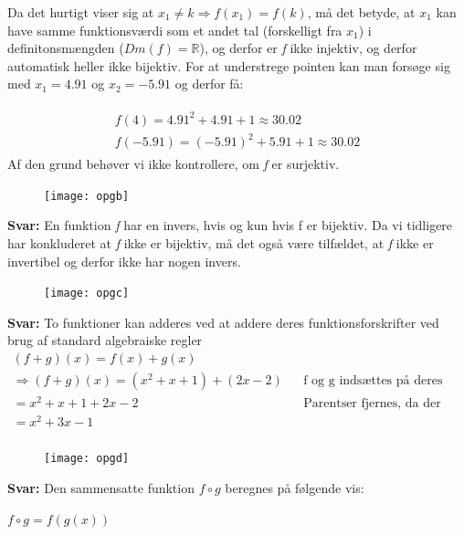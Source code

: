 \documentclass{article}
\begin{document}
Da det hurtigt viser sig at $x_1 \neq k \Rightarrow f(x_1) = f(k)$, må det betyde, at $x_1$ kan have samme funktionsværdi som et andet tal (forskelligt fra $x_1$) i definitonsmængden ($Dm(f) = \mathbb{R}$), og derfor er \emph{f} ikke injektiv, og derfor automatisk heller ikke bijektiv. For at understrege pointen kan man forsøge sig med $x_1 = 4.91$ og $x_2 = -5.91$ og derfor få:

\begin{align*}
\begin{split}
f(4) = 4.91^2 + 4.91 + 1 \approx 30.02  \\
f(-5.91) = (-5.91)^2 + 5.91 + 1 \approx 30.02
\end{split}
\end{align*}
Af den grund behøver vi ikke kontrollere, om \emph{f} er surjektiv.


\begin{figure}[h]
\texttt{[image: opgb]}
\end{figure}

\textbf{Svar:} En funktion \emph{f} har en invers, hvis og kun hvis f er bijektiv. Da vi tidligere har konkluderet at \emph{f} ikke er bijektiv, må det også være tilfældet, at \emph{f} ikke er invertibel og derfor ikke har nogen invers.

\begin{figure}[h]
\texttt{[image: opgc]}
\end{figure}
\textbf{Svar:} To funktioner kan adderes ved at addere deres funktionsforskrifter ved brug af standard algebraiske regler
\begin{align*}
(f+g)(x) = f(x) + g(x) \\
\Rightarrow (f+g)(x) = (x^2 + x + 1) + (2x - 2) && \text{f og g indsættes på deres pladser} \\
= x^2 + x + 1 + 2x - 2 && \text{Parentser fjernes, da der kun indgår + mellem dem} \\
= x^2 + 3x - 1 \\
\end{align*}

\begin{figure}[h]
\texttt{[image: opgd]}
\end{figure}
\textbf{Svar:} Den sammensatte funktion $f \circ g$ beregnes på følgende vis:
\par
\begin{center}
\begin{math}
f \circ g = f(g(x))
\end{math}
\end{center}
\end{document}
